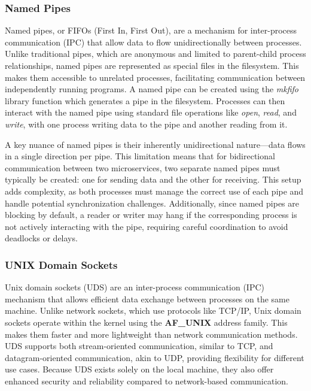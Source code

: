 \documentclass[letterpaper,twocolumn,10pt]{article}
\begin{document}
\subsubsection{Named Pipes}
Named pipes, or FIFOs (First In, First Out), are a mechanism for inter-process communication (IPC) that allow data to flow unidirectionally between processes.
Unlike traditional pipes, which are anonymous and limited to parent-child process relationships, named pipes are represented as special files in the filesystem.
This makes them accessible to unrelated processes, facilitating communication between independently running programs.
A named pipe can be created using the \textit{mkfifo} library function which generates a pipe in the filesystem.
Processes can then interact with the named pipe using standard file operations like \textit{open}, \textit{read}, and \textit{write}, with one process writing data to the pipe and another reading from it.

A key nuance of named pipes is their inherently unidirectional nature—data flows in a single direction per pipe.
This limitation means that for bidirectional communication between two microservices, two separate named pipes must typically be created: one for sending data and the other for receiving.
This setup adds complexity, as both processes must manage the correct use of each pipe and handle potential synchronization challenges.
Additionally, since named pipes are blocking by default, a reader or writer may hang if the corresponding process is not actively interacting with the pipe, requiring careful coordination to avoid deadlocks or delays.

\subsubsection{UNIX Domain Sockets}
Unix domain sockets (UDS) are an inter-process communication (IPC) mechanism that allows efficient data exchange between processes on the same machine.
Unlike network sockets, which use protocols like TCP/IP, Unix domain sockets operate within the kernel using the \textbf{AF\_UNIX} address family.
This makes them faster and more lightweight than network communication methods.
UDS supports both stream-oriented communication, similar to TCP, and datagram-oriented communication, akin to UDP, providing flexibility for different use cases.
Because UDS exists solely on the local machine, they also offer enhanced security and reliability compared to network-based communication.
\end{document}
